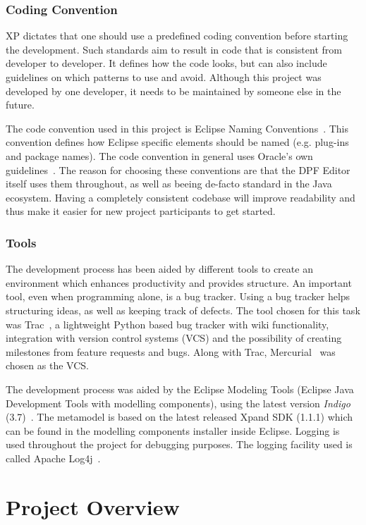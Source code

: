 \subsubsection{Coding Convention}
XP dictates that one should use a predefined coding convention before starting the development. Such standards aim to result in code that is consistent from developer to developer. It defines how the code looks, but can also include guidelines on which patterns to use and avoid. Although this project was developed by one developer, it needs to be maintained by someone else in the future.
   
The code convention used in this project is Eclipse Naming Conventions~\cite{eclipse_naming_conventions_web}. This convention defines how Eclipse specific elements should be named (e.g. plug-ins and package names). The code convention in general uses Oracle's own guidelines~\cite{java_naming_conventions_web}. The reason for choosing these conventions are that the DPF Editor itself uses them throughout, as well as beeing de-facto standard in the Java ecosystem. Having a completely consistent codebase will improve readability and thus make it easier for new project participants to get started.
  
\subsubsection{Tools}
The development process has been aided by different tools to create an environment which enhances productivity and provides structure. An important tool, even when programming alone, is a bug tracker. Using a bug tracker helps structuring ideas, as well as keeping track of defects. The tool chosen for this task was Trac~\cite{trac}, a lightweight Python based bug tracker with wiki functionality, integration with version control systems (VCS) and the possibility of creating milestones from feature requests and bugs. Along with Trac, Mercurial~\cite{mercurial} was chosen as the VCS. 

The development process was aided by the Eclipse Modeling Tools (Eclipse Java Development Tools with modelling components), using the latest version \emph{Indigo} (3.7)~\cite{Eclipse}. The metamodel is based on the latest released Xpand SDK (1.1.1) which can be found in the modelling components installer inside Eclipse. Logging is used throughout the project for debugging purposes. The logging facility used is called Apache Log4j~\cite{l4j}.

\section{Project Overview}
